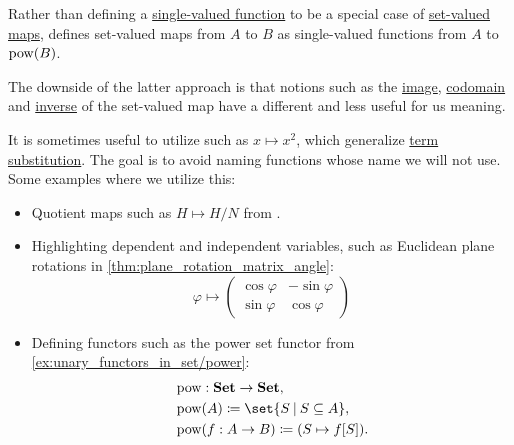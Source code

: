 \begin{remark}\label{rem:set_valued_map_as_single_valued}
  Rather than defining a \hyperref[def:function]{single-valued function} to be a special case of \hyperref[def:set_valued_map]{set-valued maps},  defines set-valued maps from \( A \) to \( B \) as single-valued functions from \( A \) to \( \operatorname{pow}(B) \).

  The downside of the latter approach is that notions such as the \hyperref[def:set_valued_map/image]{image}, \hyperref[def:set_valued_map/codomain]{codomain} and \hyperref[def:set_valued_map/inverse]{inverse} of the set-valued map have a different and less useful for us meaning.
\end{remark}

\begin{remark}\label{rem:implicit_function_notation}
  It is sometimes useful to utilize  such as \( x \mapsto x^2 \), which generalize \hyperref[def:first_order_substitution/term_in_term]{term substitution}. The goal is to avoid naming functions whose name we will not use. Some examples where we utilize this:
  \begin{itemize}
    \item Quotient maps such as \( H \mapsto H / N \) from .
    \item Highlighting dependent and independent variables, such as Euclidean plane rotations in \cref{thm:plane_rotation_matrix_angle}:
    \begin{equation*}
      \varphi
      \mapsto
      \begin{pmatrix}
        \cos \varphi & -\sin \varphi \\
        \sin \varphi & \cos \varphi
      \end{pmatrix}
    \end{equation*}

    \item Defining functors such as the power set functor from \cref{ex:unary_functors_in_set/power}:
    \begin{equation*}
      \begin{aligned}
        &\pow: \cat{Set} \to \cat{Set}, \\
        &\pow(A) \coloneqq \set{ S \given S \subseteq A }, \\
        &\pow(f: A \to B) \coloneqq (S \mapsto f[S]). \\
      \end{aligned}
    \end{equation*}
  \end{itemize}
\end{remark}

